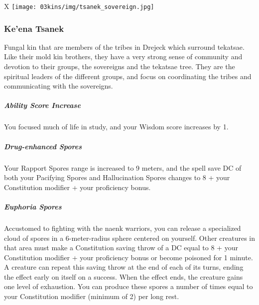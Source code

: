 \begin{linenumbers}
\begin{table*}[b]%
    \begin{DndTable}[width=\linewidth]{X}
        \texttt{[image: 03kins/img/tsanek\_sovereign.jpg]}
    \end{DndTable}
\end{table*}

\subsubsection{Ke'ena Tsanek}
Fungal kin that are members of the tribes in Drejeck which surround tekatsae.
Like their mold kin brothers, they have a very strong sense of community and devotion to their groups, the sovereigns and the tekatsae tree.
They are the spiritual leaders of the different groups, and focus on coordinating the tribes and communicating with the sovereigns.
\subparagraph{Ability Score Increase} You focused much of life in study, and your Wisdom score increases by 1.
\subparagraph{Drug-enhanced Spores} Your Rapport Spores range is increased to 9 meters, and the spell save DC of both your Pacifying Spores and Hallucination Spores changes to 8 + your Constitution modifier + your proficiency bonus.
\subparagraph{Euphoria Spores} Accustomed to fighting with the naenk warriors, you can release a specialized cloud of spores in a 6-meter-radius sphere centered on yourself.
Other creatures in that area must make a Constitution saving throw of a DC equal to 8 + your Constitution modifier + your proficiency bonus or become poisoned for 1 minute.
A creature can repeat this saving throw at the end of each of its turns, ending the effect early on itself on a success.
When the effect ends, the creature gains one level of exhaustion.
You can produce these spores a number of times equal to your Constitution modifier (minimum of 2) per long rest.


\end{linenumbers}
